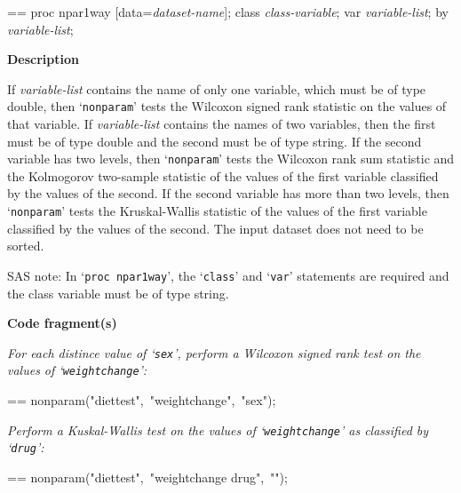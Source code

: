 \documentclass{book}
\makeatletter
\newcommand\Texinfocommandstyletextvar[1]{{\normalfont{}\textsl{#1}}}%
\newenvironment{Texinfopreformatted}{%
  \par\GNUTobeylines\obeyspaces\frenchspacing\parskip=\z@\parindent=\z@}{}
{\catcode`\^^M=13 \gdef\GNUTobeylines{\catcode`\^^M=13 \def^^M{\null\par}}}
\newenvironment{Texinfoindented}{\begin{list}{}{}\item\relax}{\end{list}}
\renewcommand{\_}{\Texinfounderscore\discretionary{}{}{}}
\makeatother
\begin{document}
\begin{Texinfoindented}
\begin{Texinfopreformatted}%
proc npar1way [data=\Texinfocommandstyletextvar{dataset-name}];
class \Texinfocommandstyletextvar{class-variable};
var \Texinfocommandstyletextvar{variable-list};
by \Texinfocommandstyletextvar{variable-list};

\end{Texinfopreformatted}
\end{Texinfoindented}

%

\noindent{}\textbf{Description}

If \Texinfocommandstyletextvar{variable-list} contains the name of only one variable,
which must be of type double, then `\texttt{nonparam}'
tests the Wilcoxon signed rank statistic on the values of that variable.
If \Texinfocommandstyletextvar{variable-list}
contains the names of two variables, then the first must be of type double
and the second must be of type string.
If the second variable has two levels, then
`\texttt{nonparam}' tests the Wilcoxon rank sum statistic
and the Kolmogorov two-sample statistic of the values
of the first variable classified by the values of the second.
If the second variable has more than two levels, then
`\texttt{nonparam}' tests the Kruskal-Wallis statistic of the values
of the first variable classified by the values of the second.
The input dataset does not need to be sorted.

SAS note: In `\texttt{proc npar1way}', the `\texttt{class}' and `\texttt{var}' statements are required
and the class variable must be of type string.

\noindent{}\textbf{Code fragment(s)}

\emph{For each distince value of `\texttt{sex}',
perform a Wilcoxon signed rank test on the values of `\texttt{weightchange}':}
\begin{Texinfoindented}
\begin{Texinfopreformatted}%
\ttfamily nonparam("diettest",\ "weightchange",\ "sex");
\end{Texinfopreformatted}
\end{Texinfoindented}

\emph{Perform a Kuskal-Wallis test on the values of `\texttt{weightchange}'
as classified by `\texttt{drug}':}
\begin{Texinfoindented}
\begin{Texinfopreformatted}%
\ttfamily nonparam("diettest",\ "weightchange drug",\ "");
\end{Texinfopreformatted}
\end{Texinfoindented}
%
%
%
%
%
%
%
\end{document}

